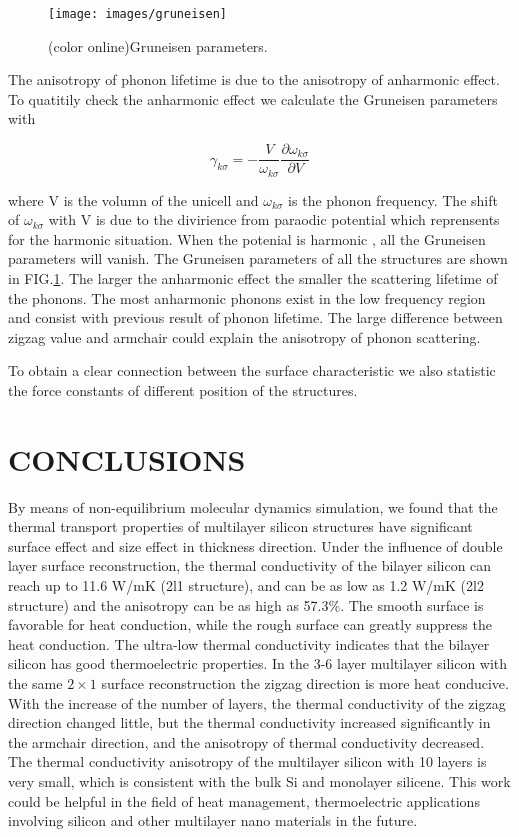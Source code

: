 \documentclass[%
 reprint,
 amsmath,amssymb,
 aps,
 prb,
]{revtex4-1}
\begin{document}
\begin{figure}[b]
  \texttt{[image: images/gruneisen]}
  \caption{\label{fig:gruneisen} (color online)Gruneisen parameters.}
\end{figure}

The anisotropy of phonon lifetime is due to the anisotropy of anharmonic effect. To quatitily check the anharmonic effect we calculate the Gruneisen parameters with

\begin{equation}
  \gamma_{k \sigma}=- \frac{V}{\omega_{k \sigma}} \frac{\partial \omega_{k \sigma}}{\partial V}
\end{equation}

where V is the volumn of the unicell and $\omega_{k \sigma}$ is the phonon frequency. The shift of $\omega_{k \sigma}$ with V is due to the divirience from paraodic potential which reprensents for the harmonic situation. When the potenial is harmonic , all the Gruneisen parameters will vanish.
The Gruneisen parameters of all the structures are shown in FIG.\ref{fig:gruneisen}. The larger the anharmonic effect the smaller the scattering lifetime of the phonons. The most anharmonic phonons exist in the low frequency region and consist with previous result of phonon lifetime. The large difference between zigzag value and armchair could explain the anisotropy of phonon scattering.

To obtain a clear connection between  the surface characteristic we also statistic the force constants of different position of the structures.



\section{CONCLUSIONS}

By means of non-equilibrium molecular dynamics simulation, we found that the thermal transport properties of multilayer silicon structures have significant surface effect and size effect in thickness direction. Under the influence of double layer surface reconstruction, the thermal conductivity of the bilayer silicon can reach up to 11.6 W/mK (2l1 structure), and can be as low as 1.2 W/mK (2l2 structure) and the anisotropy can be as high as 57.3\%. The smooth surface is favorable for heat conduction, while the rough surface can greatly suppress the heat conduction. The ultra-low thermal conductivity indicates that the bilayer silicon has good thermoelectric properties. In the 3-6 layer multilayer silicon with the same $2 \times 1$ surface reconstruction the zigzag direction is more heat conducive. With the increase of the number of layers, the thermal conductivity of the zigzag direction changed little, but the thermal conductivity increased significantly in the armchair direction, and the anisotropy of thermal conductivity decreased. The thermal conductivity anisotropy of the multilayer silicon with 10 layers is very small, which is consistent with the bulk Si and monolayer silicene. This work could be helpful in the field of heat management, thermoelectric applications involving silicon and other multilayer nano materials in the future.
\end{document}
